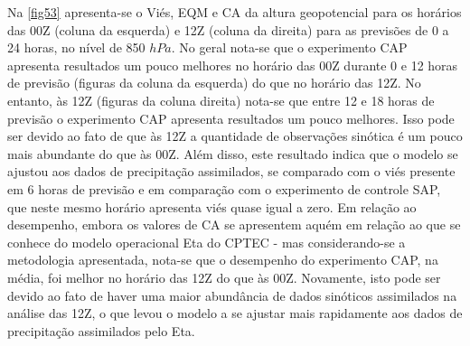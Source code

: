 Na \autoref{fig53} apresenta-se o Viés, EQM e CA da altura geopotencial para os horários das 00Z (coluna da esquerda) e 12Z (coluna da direita) para as previsões de 0 a 24 horas, no nível de 850 $hPa$. No geral nota-se que o experimento CAP apresenta resultados um pouco melhores no horário das 00Z durante 0 e 12 horas de previsão (figuras da coluna da esquerda) do que no horário das 12Z. No entanto, às 12Z (figuras da coluna direita) nota-se que entre 12 e 18 horas de previsão o experimento CAP apresenta resultados um pouco melhores. Isso pode ser devido ao fato de que às 12Z a quantidade de observações sinótica é um pouco mais abundante do que às 00Z. Além disso, este resultado indica que o modelo se ajustou aos dados de precipitação assimilados, se comparado com o viés presente em 6 horas de previsão e em comparação com o experimento de controle SAP, que neste mesmo horário apresenta viés quase igual a zero. Em relação ao desempenho, embora os valores de CA se apresentem aquém em relação ao que se conhece do modelo operacional Eta do CPTEC - mas considerando-se a metodologia apresentada, nota-se que o desempenho do experimento CAP, na média, foi melhor no horário das 12Z do que às 00Z. Novamente, isto pode ser devido ao fato de haver uma maior abundância de dados sinóticos assimilados na análise das 12Z, o que levou o modelo a se ajustar mais rapidamente aos dados de precipitação assimilados pelo Eta.

\break

